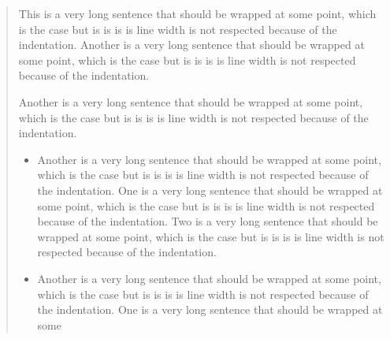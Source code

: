 \begin{abstract}
    This is a very long sentence that
    should be wrapped at some point,
    which is the case but is is is is
    line width is not respected because
    of the indentation.
    Another is a very long sentence
    that should be wrapped at some
    point, which is the case but is is
    is is line width is not respected
    because of the indentation.
    \begin{another}
        Another is a very long
        sentence that should be wrapped
        at some point, which is the
        case but is is is is line width
        is not respected because of the
        indentation.
        \begin{itemize}
            \item
                  Another is a very
                  long sentence that
                  should be wrapped at
                  some point, which is
                  the case but is is is
                  is line width is not
                  respected because of
                  the indentation.
                  One is a very long
                  sentence that should
                  be wrapped at some
                  point, which is the
                  case but is is is is
                  line width is not
                  respected because of
                  the indentation.
                  Two is a very long
                  sentence that should
                  be wrapped at some
                  point, which is the
                  case but is is is is
                  line width is not
                  respected because of
                  the indentation.
            \item
                  Another is a very
                  long sentence that
                  should be wrapped at
                  some point, which is
                  the case but is is is
                  is line width is not
                  respected because of
                  the indentation.
                  One is a very long
                  sentence that should
                  be wrapped at some

\end{itemize}
\end{another}
\end{abstract}
